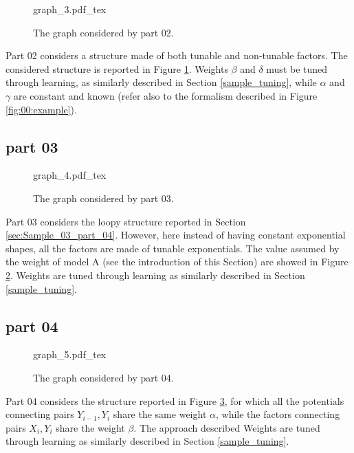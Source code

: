 \begin{figure}
	\centering
\def\svgwidth{0.5 \textwidth}
{graph_3.pdf_tex} 
\caption{The graph considered by part 02.}
\label{fig:sample_06:1}
\end{figure}

Part 02 considers a structure made of both tunable and non-tunable factors. The considered structure is reported in Figure \ref{fig:sample_06:1}.
Weights $\beta$ and $\delta$ must be tuned through learning, as similarly described in Section \ref{sample_tuning}, while $\alpha$ and $\gamma$ are constant and known (refer also to the formalism described in Figure \ref{fig:00:example}).

\subsection{part 03}

\begin{figure}
	\centering
\def\svgwidth{0.75 \textwidth}
{graph_4.pdf_tex} 
\caption{The graph considered by part 03.}
\label{fig:sample_06:2}
\end{figure}

Part 03 considers the loopy structure reported in Section \ref{sec:Sample_03_part_04}. However, here instead of having constant exponential shapes, all the factors are made of tunable exponentials. The value assumed by the weight of model A (see the introduction of this Section) are showed in Figure \ref{fig:sample_06:2}.
Weights are tuned through learning as similarly described in Section \ref{sample_tuning}.

\subsection{part 04}

\begin{figure}
	\centering
\def\svgwidth{0.45 \textwidth}
{graph_5.pdf_tex} 
\caption{The graph considered by part 04.}
\label{fig:sample_06:3}
\end{figure}

Part 04 considers the structure reported in Figure \ref{fig:sample_06:3}, for which all the potentials connecting pairs $Y_{i-1}, Y_i$ share the same weight $\alpha$, while the factors connecting pairs $X_i,Y_i$ share the weight $\beta$. The approach described
Weights are tuned through learning as similarly described in Section \ref{sample_tuning}.

